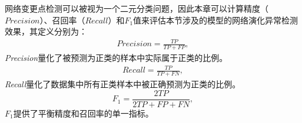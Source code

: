 
网络变更点检测可以被视为一个二元分类问题，因此本章可以计算精度（$Precision$）、召回率（$Recall$）和${F_1}$值来评估本节涉及的模型的网络演化异常检测效果，其定义分别为：
\begin{equation}
    \begin{split}
        Precision = \frac{TP}{TP + FP},
    \end{split}
\end{equation}
\emph{Precision}量化了被预测为正类的样本中实际属于正类的比例。
\begin{equation}
    \begin{split}
        Recall = \frac{TP}{TP + FN},
    \end{split}
\end{equation}
\emph{Recall}量化了数据集中所有正类样本中被正确预测为正类的比例。
\begin{equation}
        F_1 = \frac{2TP}{2TP + FP + FN},
\end{equation}
${F_1}$提供了平衡精度和召回率的单一指标。

